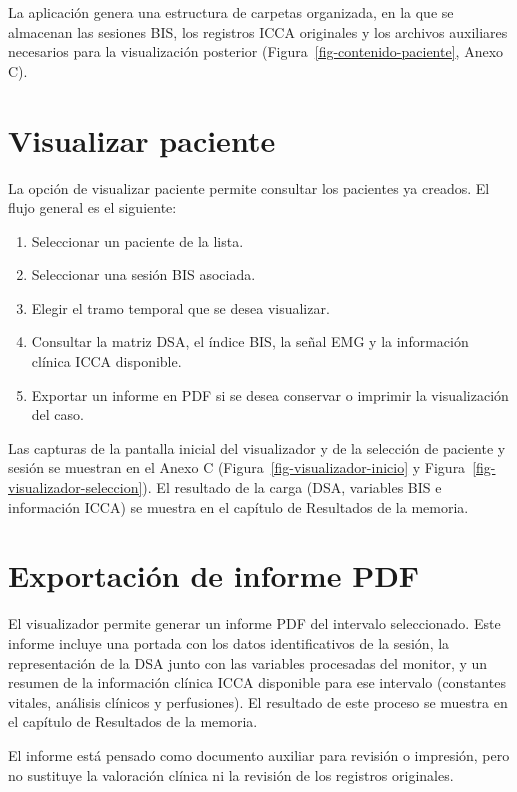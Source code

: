 \documentclass[
  spanish,
  a4paper,
  12pt,
  twoside]{memoir}
\providecommand{\tightlist}{%
  \setlength{\itemsep}{0pt}\setlength{\parskip}{0pt}}
\begin{document}
La aplicación genera una estructura de carpetas organizada, en la que se
almacenan las sesiones BIS, los registros ICCA originales y los archivos
auxiliares necesarios para la visualización posterior
(Figura~\ref{fig-contenido-paciente}, Anexo C).

\section{Visualizar paciente}\label{visualizar-paciente}

La opción de visualizar paciente permite consultar los pacientes ya
creados. El flujo general es el siguiente:

\begin{enumerate}
\def\labelenumi{\arabic{enumi}.}
\tightlist
\item
  Seleccionar un paciente de la lista.
\item
  Seleccionar una sesión BIS asociada.
\item
  Elegir el tramo temporal que se desea visualizar.
\item
  Consultar la matriz DSA, el índice BIS, la señal EMG y la información
  clínica ICCA disponible.
\item
  Exportar un informe en PDF si se desea conservar o imprimir la
  visualización del caso.
\end{enumerate}

Las capturas de la pantalla inicial del visualizador y de la selección
de paciente y sesión se muestran en el Anexo C
(Figura~\ref{fig-visualizador-inicio} y
Figura~\ref{fig-visualizador-seleccion}). El resultado de la carga (DSA,
variables BIS e información ICCA) se muestra en el capítulo de
Resultados de la memoria.

\section{Exportación de informe
PDF}\label{exportaciuxf3n-de-informe-pdf}

El visualizador permite generar un informe PDF del intervalo
seleccionado. Este informe incluye una portada con los datos
identificativos de la sesión, la representación de la DSA junto con las
variables procesadas del monitor, y un resumen de la información clínica
ICCA disponible para ese intervalo (constantes vitales, análisis
clínicos y perfusiones). El resultado de este proceso se muestra en el
capítulo de Resultados de la memoria.

El informe está pensado como documento auxiliar para revisión o
impresión, pero no sustituye la valoración clínica ni la revisión de los
registros originales.
\end{document}
